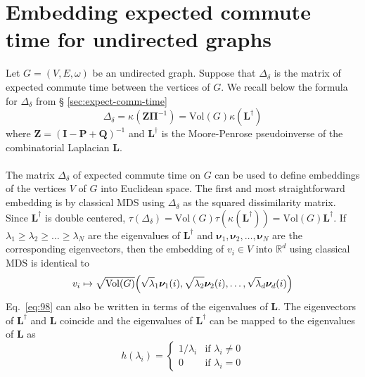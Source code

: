 \section{Embedding expected commute time for undirected graphs}
\label{sec:embedd-expect-comm}
Let $G = (V,E,\omega)$ be an undirected graph. Suppose that
$\Delta_{\delta}$ is the matrix of expected commute time between the
vertices of $G$. We recall below the formula for $\Delta_{\delta}$ from \S
\ref{sec:expect-comm-time} 
\begin{equation}
  \label{eq:101}
  \Delta_{\delta} = \kappa(\mathbf{Z}\bm{\Pi}^{-1}) = \mathrm{Vol}(G)
  \kappa(\mathbf{L}^{\dagger})
\end{equation}
where $\mathbf{Z} = (\mathbf{I} - \mathbf{P} + \mathbf{Q})^{-1}$ and
$\mathbf{L}^{\dagger}$ is the Moore-Penrose pseudoinverse of the
combinatorial Laplacian $\mathbf{L}$.  \\ \\
%
%
\noindent 
The matrix $\Delta_{\delta}$ of expected commute time on $G$ can be
used to define embeddings of the vertices $V$ of $G$ into Euclidean
space. The first and most straightforward embedding is by classical
MDS using $\Delta_{\delta}$ as the squared dissimilarity matrix. Since
$\mathbf{L}^{\dagger}$ is double centered, $\tau(\Delta_{\delta}) =
\mathrm{Vol}(G)\tau(\kappa(\mathbf{L}^{\dagger})) = \mathrm{Vol}(G)
\mathbf{L}^{\dagger}$. If $\lambda_1 \geq \lambda_2 \geq \dots \geq
\lambda_N$ are the eigenvalues of $\mathbf{L}^{\dagger}$ and
$\bm{\nu}_1, \bm{\nu}_2, \dots, \bm{\nu}_N$ are the corresponding
eigenvectors, then the embedding of $v_i \in V$ into $\mathbb{R}^{d}$
using classical MDS is identical to 
\begin{equation}
  \label{eq:98}
  v_i \mapsto \sqrt{\mathrm{Vol}(G)} 
\Bigl(\sqrt{\lambda}_1 \bm{\nu}_1(i), \sqrt{\lambda_2}
  \bm{\nu}_2(i), \dots, \sqrt{\lambda}_d \bm{\nu}_d(i) \Bigr)
\end{equation}
Eq.~\eqref{eq:98} can also be written in terms of the eigenvalues of
$\mathbf{L}$. The eigenvectors of $\mathbf{L}^{\dagger}$ and
$\mathbf{L}$ coincide and the eigenvalues of
$\mathbf{L}^{\dagger}$ can be mapped to the eigenvalues of
$\mathbf{L}$ as
\begin{equation}
  \label{eq:99}
  h(\lambda_i) = \begin{cases}
    1/\lambda_i & \text{if $\lambda_i \not = 0$} \\
    0 & \text{if $\lambda_i = 0$}
    \end{cases}
\end{equation} \\ \\
